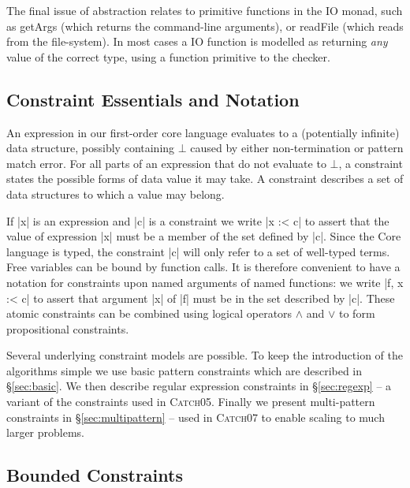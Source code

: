 \documentclass[preprint]{sigplanconf}
\newcommand{\C}[1]{\textsf{#1}}
\newcommand{\catch}{\textsc{Catch}}
\newenvironment{discuss}
    {\noindent\hspace{-1.5mm}\vline\hspace{1mm}\vline\hspace{1mm}\begin{minipage}[h]{\linewidth}}
    {\end{minipage}}
\begin{document}
The final issue of abstraction relates to primitive functions in the \C{IO} monad, such as \C{getArgs} (which returns the command-line arguments), or \C{readFile} (which reads from the file-system). In most cases a IO function is modelled as returning \textit{any} value of the correct type, using a function primitive to the checker.


\subsection{Constraint Essentials and Notation}
\label{sec:constraints}

\begin{discuss}
An expression in our first-order core language evaluates to a (potentially infinite) data structure, possibly containing $\bot{}$ caused by either non-termination or pattern match error. For all parts of an expression that do not evaluate to $\bot{}$, a constraint states the possible forms of data value it may take. A constraint describes a set of data structures to which a value may belong.
\end{discuss}

If |x| is an expression and |c| is a constraint we write |x :< c| to assert that the value of expression |x| must be a member of the set defined by |c|. Since the Core language is typed, the constraint |c| will only refer to a set of well-typed terms. Free variables can be bound by function calls. It is therefore convenient to have a notation for constraints upon named arguments of named functions: we write |f, x :< c| to assert that argument |x| of |f| must be in the set described by |c|. These atomic constraints can be combined using logical operators $\wedge{}$ and $\vee{}$ to form propositional constraints.

Several underlying constraint models are possible. To keep the introduction of the algorithms simple we use basic pattern constraints which are described in \S\ref{sec:basic}. We then describe regular expression constraints in \S\ref{sec:regexp} -- a variant of the constraints used in \catch05. Finally we present multi-pattern constraints in \S\ref{sec:multipattern} -- used in \catch07 to enable scaling to much larger problems.

\subsection{Bounded Constraints}
\label{sec:bounded}
\end{document}
